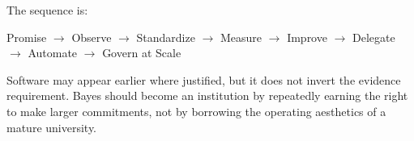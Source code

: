 The sequence is:
\begin{center}
\small
Promise $\longrightarrow$ Observe $\longrightarrow$ Standardize $\longrightarrow$ Measure $\longrightarrow$ Improve $\longrightarrow$ Delegate $\longrightarrow$ Automate $\longrightarrow$ Govern at Scale
\end{center}

Software may appear earlier where justified, but it does not invert the evidence requirement. Bayes should become an institution by repeatedly earning the right to make larger commitments, not by borrowing the operating aesthetics of a mature university.
